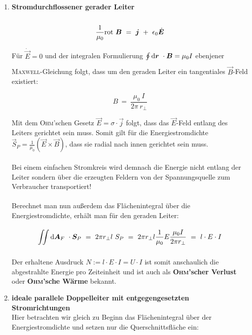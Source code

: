 \begin{enumerate}
\item \textbf{ Stromdurchflossener gerader Leiter}\\
\ \\
\begin{equation*}
\frac{1}{\mu_0} \text{rot } \bm{B} \ = \ \bm{j} \ + \ \epsilon_0 \dot{\bm{E}}
\end{equation*}

Für $\dot{\vec{E}}=0$ und der integralen Formulierung $\oint\limits_{{}}^{{}}\mathrm{d}{\bm{r}}\  \cdot \bm{B} = \mu_0 I$ ebenjener \textsc{Maxwell}-Gleichung folgt, dass um den geraden Leiter ein tangentiales $\vec{B}$-Feld existiert:

\begin{equation*}
B \ = \ \frac{\mu_0 \ I}{2\pi \ r_{\perp}}
\end{equation*}

Mit dem \textsc{Ohm}'schen Gesetz $\vec{E} = \sigma \cdot\vec{j}$ folgt, dass das $\vec{E}$-Feld entlang des Leiters gerichtet sein muss. Somit gilt für die Energiestromdichte $\vec{S}_P = \frac{1}{\mu_0} \left(\vec{E}\times\vec{B}\right)$, dass sie radial nach innen gerichtet sein muss.\\
\ \\
Bei einem einfachen Stromkreis wird demnach die Energie nicht entlang der Leiter sondern über die erzeugten Feldern von der Spannungsquelle zum Verbraucher transportiert!\\
\ \\
Berechnet man nun außerdem das Flächenintegral über die Energiestromdichte, erhält man für den geraden Leiter:

\begin{equation*}
\Iint{}{}{\vec{A}_F}\cdot\vec{S}_P \ = \ 2\pi r_{\perp} l \ S_P \ = \ 2\pi r_{\perp} l \frac{1}{\mu_0}E\frac{\mu_0 I}{2\pi r_{\perp}} \ = \ l \cdot E \cdot I
\end{equation*}

Der erhaltene Ausdruck $N := l \cdot E \cdot I = U \cdot I$ ist somit anschaulich die abgestrahlte Energie pro Zeiteinheit und ist auch als \textbf{\textsc{Ohm}'scher Verlust} oder \textbf{\textsc{Ohm}'sche Wärme} bekannt.


\item \textbf{ ideale parallele Doppelleiter mit entgegengesetzten Stromrichtungen}
\ \\

Hier betrachten wir gleich zu Beginn das Flächenintegral über der Energiestromdichte und setzen nur die Querschnittsfläche ein:


\end{enumerate}
